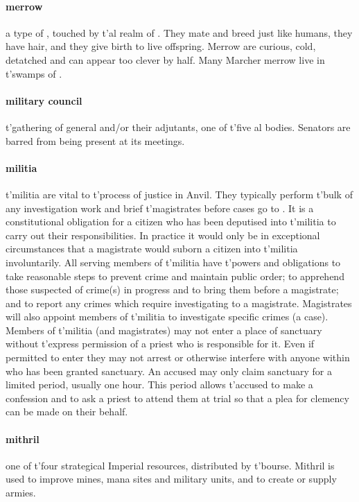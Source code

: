 \paragraph{merrow} a type of , touched by t'\allowbreak {}al realm of . They mate and breed just like humans, they have hair, and they give birth to live offspring. Merrow are curious, cold, detatched and can appear too clever by half. Many Marcher merrow live in t'\allowbreak swamps of .
\paragraph{military council} t'\allowbreak gathering of general and/or their adjutants, one of t'\allowbreak five \-al bodies. Senators are barred from being present at its meetings.
\paragraph{militia} t'\allowbreak militia are vital to t'\allowbreak process of justice in Anvil. They typically perform t'\allowbreak bulk of any investigation work and brief t'\allowbreak magistrates before cases go to . It is a constitutional obligation for a citizen who has been deputised into t'\allowbreak militia to carry out their responsibilities. In practice it would only be in exceptional circumstances that a magistrate would suborn a citizen into t'\allowbreak militia involuntarily. All serving members of t'\allowbreak militia have t'\allowbreak powers and obligations to take reasonable steps to prevent crime and maintain public order; to apprehend those suspected of crime(s) in progress and to bring them before a magistrate; and to report any crimes which require investigating to a magistrate. Magistrates will also appoint members of t'\allowbreak militia to investigate specific crimes (a case). Members of t'\allowbreak militia (and magistrates) may not enter a place of sanctuary without t'\allowbreak express permission of a priest who is responsible for it. Even if permitted to enter they may not arrest or otherwise interfere with anyone within who has been granted sanctuary. An accused may only claim sanctuary for a limited period, usually one hour. This period allows t'\allowbreak accused to make a confession and to ask a priest to attend them at trial so that a plea for clemency can be made on their behalf.
\paragraph{mithril} one of t'\allowbreak four strategical Imperial resources, distributed by t'\allowbreak bourse. Mithril is used to improve mines, mana sites and military units, and to create or supply armies.

